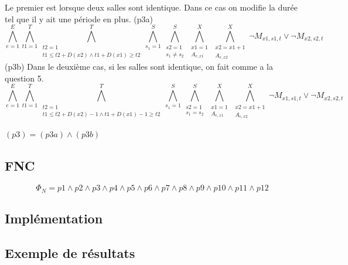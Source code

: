 \documentclass[a4paper,11pt]{article}
\begin{document}
Le premier est lorsque deux salles sont identique. Dans ce cas on modifie la durée tel que il y ait une période en plus.
(p3a)
\begin{displaymath}
\bigwedge\limits_{e=1}^{E}\bigwedge\limits_{t1=1}^{T}\bigwedge\limits_{\substack{t2=1 \\ t1 \leq t2 + D(x2) \wedge t1 + D(x1) \geq t2}}^{T}\bigwedge\limits_{s_{1}=1}^{S}\bigwedge\limits_{\substack{s2=1 \\ s_{1} \neq s_{2}}}^{S}\bigwedge\limits_{\substack{x1=1 \\ A_{e,x1}}}^{X}\bigwedge\limits_{\substack{x2=x1+1 \\ A_{e,x2}}}^{X} \neg M_{x1, s1, t} \vee \neg M_{x2, s2, t}
\end{displaymath}
(p3b)
Dans le deuxième cas, si les salles sont identique, on fait comme a la question 5.
\begin{displaymath}
\bigwedge\limits_{e=1}^{E}\bigwedge\limits_{t1=1}^{T}\bigwedge\limits_{\substack{t2=1 \\ t1 \leq t2 + D(x2)-1 \wedge t1 + D(x1)-1 \geq t2}}^{T}\bigwedge\limits_{s_{1}=1}^{S}\bigwedge\limits_{\substack{s2=1 \\ s_{1} = s_{2}}}^{S}\bigwedge\limits_{\substack{x1=1 \\ A_{e,x1}}}^{X}\bigwedge\limits_{\substack{x2=x1+1 \\ A_{e,x2}}}^{X} \neg M_{x1, s1, t} \vee \neg M_{x2, s2, t}
\end{displaymath}

$ (p3) = (p3a) \wedge (p3b) $
\subsection{FNC}
\begin{displaymath}
	\Phi_{N} = p1 \wedge p2 \wedge p3 \wedge p4 \wedge p5 \wedge p6 \wedge p7 \wedge p8 \wedge p9 \wedge p10 \wedge p11 \wedge p12
\end{displaymath}
\subsection{Implémentation}
\subsection{Exemple de résultats}
\end{document}
